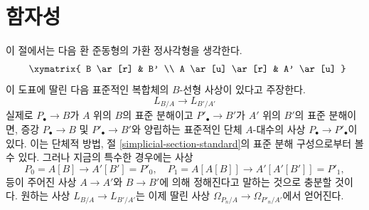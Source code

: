 \section{함자성}
\label{section-functoriality}

\noindent
이 절에서는 다음 환 준동형의 가환 정사각형을 생각한다.
\begin{equation}
\label{equation-commutative-square}
\vcenter{
\xymatrix{
B \ar[r] & B' \\
A \ar[u] \ar[r] & A' \ar[u]
}
}
\end{equation}
이 도표에 딸린 다음 표준적인 복합체의 $B$-선형 사상이 있다고 주장한다.
$$
L_{B/A} \longrightarrow L_{B'/A'}
$$
실제로 $P_\bullet\to B$가 $A$ 위의 $B$의 표준 분해이고
$P'_\bullet\to B'$가 $A'$ 위의 $B'$의 표준 분해이면, 증강
$P_\bullet\to B$ 및 $P'_\bullet\to B'$와 양립하는 표준적인 단체
$A$-대수의 사상 $P_\bullet\to P'_\bullet$이 있다. 이는 단체적 방법,
절 \ref{simplicial-section-standard}의 표준 분해 구성으로부터 볼 수 있다.
그러나 지금의 특수한 경우에는 사상
$$
P_0 = A[B] \longrightarrow A'[B'] = P'_0,\quad
P_1 = A[A[B]] \longrightarrow A'[A'[B']] = P'_1,
$$
등이 주어진 사상 $A\to A'$와 $B\to B'$에 의해 정해진다고 말하는
것으로 충분할 것이다. 원하는 사상 $L_{B/A}\to L_{B'/A'}$는 이제 딸린
사상 $\Omega_{P_n/A}\to\Omega_{P'_n/A'}$에서 얻어진다.

